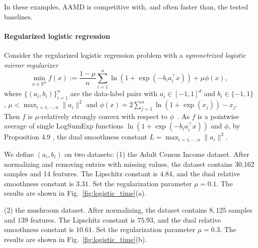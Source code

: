 \documentclass{article}
\theoremstyle{plain}
\theoremstyle{definition}
\theoremstyle{remark}
\begin{document}

In these examples, AAMD is competitive with, and often faster than, the
tested baselines.

\paragraph{Regularized logistic regression}\label{sec:logistic}
Consider the regularized logistic regression problem with a \textit{symmetrized logistic mirror regularizer}
\begin{equation}\label{eq:logisticregression}
    \min_{x \in \mathbb{R}^d} f(x) := \frac{1-\mu}{n} \sum_{i=1}^n \ln(1 + \exp(-b_i a_i^\top x)) + \mu \phi(x),
\end{equation}
where $\{(a_i,b_i)\}_{i=1}^n$ are the data-label pairs with $a_i \in [-1,1]^d$ and $b_i \in \{-1,1\}$, $\mu<\max_{i=1,\cdots,n}\|a_i\|^2$ and $\phi(x)=2\sum_{j=1}^n \ln(1+\exp(x_j))-x_j$. Then $f$ is $\mu$-relatively strongly convex with respect to $\phi$~\cite{lu2018relatively}. As $f$ is a pointwise average of single LogSumExp functions $\ln(1+\exp(-b_i a_i^\top x))$ and $\phi$, by Proposition 4.9 \cite{laude2025anisotropic}, the dual smoothness constant $L=\max_{i=1,\cdots,n}\|a_i\|^2$.

We define $(a_i,b_i)$ on two datasets: (1) the Adult Census Income dataset. After normalizing and removing entries with missing values, the dataset contains
30,162 samples and 14 features. The Lipschitz constant is $4.84$, and the dual relative smoothness constant is $3.31$. Set the regularization parameter $\mu=0.1$. The results are shown in Fig.~\ref{fig:logistic_time}(a). 

(2) the mushroom dataset. After normalizing, the dataset contains $8,125$ samples and $139$ features. The Lipschitz constant is $75.93$, and the dual relative smoothness constant is $10.61$. Set the regularization parameter $\mu=0.3$. The results are shown in Fig.~\ref{fig:logistic_time}(b).
\end{document}

